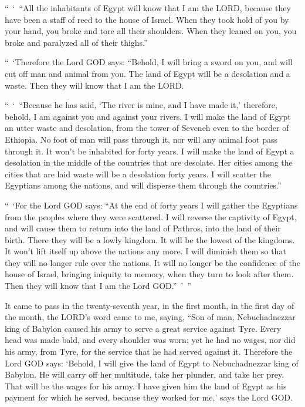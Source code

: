 \myverse{}“ ‘ “All the inhabitants of Egypt will know that I am the LORD,
because they have been a staff of reed to the house of Israel.
\myverse{}When they took hold of you by your hand, you broke and tore all their shoulders.
When they leaned on you, you broke and paralyzed all of their thighs.”

\myverse{}“ ‘Therefore the Lord GOD says: “Behold, I will bring a sword on
you, and will cut off man and animal from you.
\myverse{}The land of Egypt will be a desolation and a waste. Then they will know that
I am the LORD.

“ ‘ “Because he has said, ‘The river is mine, and I have made it,’
\myverse{}therefore, behold, I am against you and against your rivers. I will make
the land of Egypt an utter waste and desolation, from the tower of Seveneh even to the border of Ethiopia.
\myverse{}No foot of man will pass through it, nor will any animal foot pass through
it. It won’t be inhabited for forty years.
\myverse{}I will make the land of Egypt a desolation in the middle of the countries
that are desolate. Her cities among the cities that are laid waste will be a desolation forty years. I
will scatter the Egyptians among the nations, and will disperse them through the countries.”

\myverse{}“ ‘For the Lord GOD says: “At the end of forty years I will gather
the Egyptians from the peoples where they were scattered.
\myverse{}I will reverse the captivity of Egypt, and will cause them to return into
the land of Pathros, into the land of their birth. There they will be a lowly kingdom.
\myverse{}It will be the lowest of the kingdoms. It won’t lift itself up above the
nations any more. I will diminish them so that they will no longer rule over the nations.
\myverse{}It will no longer be the confidence of the house of Israel, bringing iniquity
to memory, when they turn to look after them. Then they will know that I am the Lord GOD.” ’ ”


\vspace{\baselineskip} \myverse{}It came to pass in the twenty-seventh year, in the first month,
in the first day of the month, the LORD’s word came to me, saying,
\myverse{}“Son of man, Nebuchadnezzar king of Babylon caused his army to serve a great
service against Tyre. Every head was made bald, and every shoulder was worn; yet he had no wages, nor
did his army, from Tyre, for the service that he had served against it.
\myverse{}Therefore the Lord GOD says: ‘Behold, I will give the land of Egypt to Nebuchadnezzar
king of Babylon. He will carry off her multitude, take her plunder, and take her prey. That will be the
wages for his army.
\myverse{}I have given him the land of Egypt as his payment for which he served, because
they worked for me,’ says the Lord GOD.

